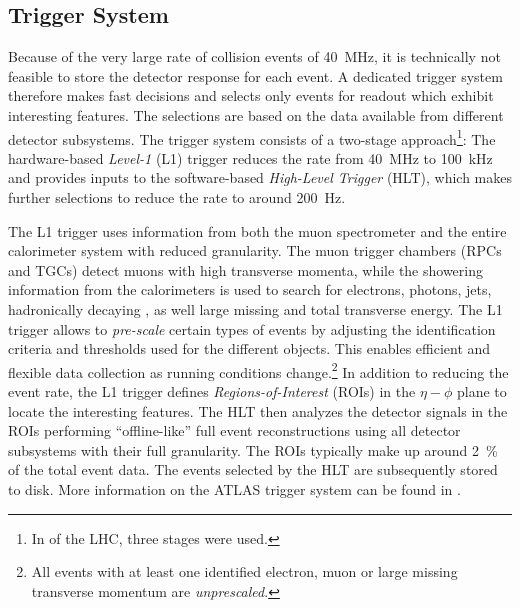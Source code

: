 \subsection{Trigger System}
Because of the very large rate of collision events of \SI{40}{\mega\hertz}, it is technically not feasible to store the detector response for each event. 
A dedicated trigger system therefore makes fast decisions and selects only events for readout which exhibit interesting features. 
The selections are based on the data available from different detector subsystems.
The \RunTwo trigger system consists of a two-stage approach\footnote{In \RunOne of the LHC, three stages were used.}: 
The hardware-based \emph{Level-1} (L1) trigger reduces the rate from \SI{40}{\mega\hertz} to \SI{100}{\kilo\hertz} and provides inputs to the software-based \emph{High-Level Trigger} (HLT), which makes further selections to reduce the rate to around \SI{200}{\hertz}. 

The L1 trigger uses information from both the muon spectrometer and the entire calorimeter system with reduced granularity. 
The muon trigger chambers (RPCs and TGCs) detect muons with high transverse momenta, while the showering information from the calorimeters is used to search for electrons, photons, jets, hadronically decaying \tauleptons, as well large missing and total transverse energy. 
The L1 trigger allows to \emph{pre-scale} certain types of events by adjusting the identification criteria and thresholds used for the different objects. This enables efficient and flexible data collection as running conditions change.\footnote{All events with at least one identified electron, muon or large missing transverse momentum are \emph{unprescaled}.}
In addition to reducing the event rate, the L1 trigger defines \emph{Regions-of-Interest} (ROIs) in the $\eta-\phi$ plane to locate the interesting features.
The HLT then analyzes the detector signals in the ROIs performing ``offline-like'' full event reconstructions using all detector subsystems with their full granularity. The ROIs typically make up around \SI{2}{\percent} of the total event data. 
The events selected by the HLT are subsequently stored to disk. 
More information on the ATLAS trigger system can be found in .

